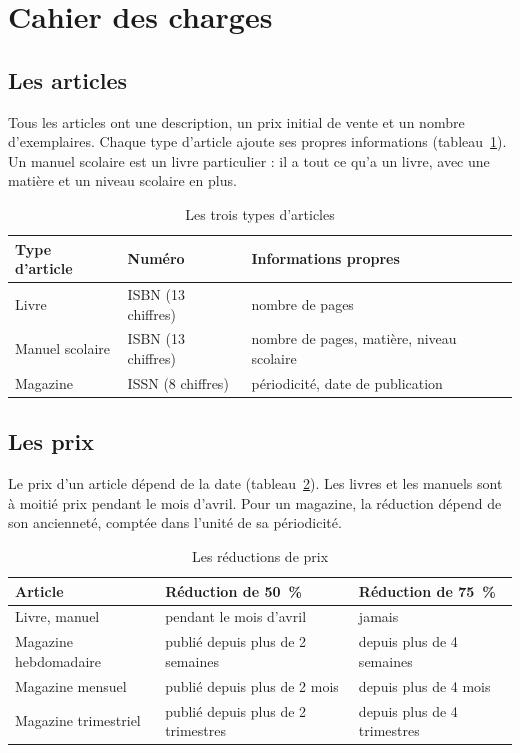 \documentclass[11pt,a4paper]{article}
\begin{document}
\section{Cahier des charges}
\label{sec:cahier}

\subsection{Les articles}

Tous les articles ont une description, un prix initial de vente et un nombre d'exemplaires. Chaque
type d'article ajoute ses propres informations (tableau~\ref{tab:articles}). Un manuel scolaire est
un livre particulier : il a tout ce qu'a un livre, avec une matière et un niveau scolaire en plus.

\begin{table}[H]
\centering
\begin{tabular}{@{}lll@{}}
\toprule
Type d'article & Numéro & Informations propres \\
\midrule
Livre & ISBN (13 chiffres) & nombre de pages \\
Manuel scolaire & ISBN (13 chiffres) & nombre de pages, matière, niveau scolaire \\
Magazine & ISSN (8 chiffres) & périodicité, date de publication \\
\bottomrule
\end{tabular}
\caption{Les trois types d'articles}
\label{tab:articles}
\end{table}

\subsection{Les prix}

Le prix d'un article dépend de la date (tableau~\ref{tab:prix}). Les livres et les manuels sont à
moitié prix pendant le mois d'avril. Pour un magazine, la réduction dépend de son ancienneté,
comptée dans l'unité de sa périodicité.

\begin{table}[H]
\centering
\begin{tabular}{@{}lll@{}}
\toprule
Article & Réduction de 50~\% & Réduction de 75~\% \\
\midrule
Livre, manuel & pendant le mois d'avril & jamais \\
Magazine hebdomadaire & publié depuis plus de 2 semaines & depuis plus de 4 semaines \\
Magazine mensuel & publié depuis plus de 2 mois & depuis plus de 4 mois \\
Magazine trimestriel & publié depuis plus de 2 trimestres & depuis plus de 4 trimestres \\
\bottomrule
\end{tabular}
\caption{Les réductions de prix}
\label{tab:prix}
\end{table}
\end{document}
